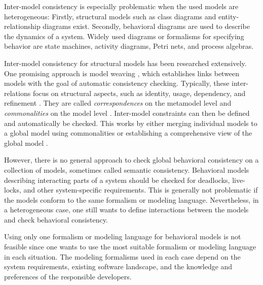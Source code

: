 \documentclass[conference]{IEEEtran}
\begin{document}
Inter-model consistency is especially problematic when the used models are heterogeneous:
Firstly, structural models such as class diagrams and entity-relationship diagrams exist.
Secondly, behavioral diagrams are used to describe the dynamics of a system.
Widely used diagrams or formalisms for specifying behavior are state machines, activity diagrams, Petri nets, and process algebras.

Inter-model consistency for structural models has been researched extensively.
One promising approach is model weaving \cite{bezivinCanonicalSchemeModel2006}, which establishes links between models with the goal of automatic consistency checking.
Typically, these inter-relations focus on structural aspects, such as identity, usage, dependency, and refinement \cite{feldmannManagingIntermodelInconsistencies2019, torresSystematicLiteratureReview2020}.
They are called \textit{correspondences} on the metamodel level and \textit{commonalities} on the model level \cite{stunkelMultipleModelSynchronization2020, klareCommonalitiesPreservingConsistency2019}.
Inter-model constraints can then be defined and automatically be checked.
This works by either merging individual models to a global model using commonalities \cite{stunkelMultimodelCorrespondenceIntermodel2018} or establishing a comprehensive view of the global model \cite{stunkelMultipleModelSynchronization2020}.

However, there is no general approach to check global behavioral consistency on a collection of models, sometimes called semantic consistency.
Behavioral models describing interacting parts of a system should be checked for deadlocks, live-locks, and other system-specific requirements.
This is generally not problematic if the models conform to the same formalism or modeling language.
Nevertheless, in a heterogeneous case, one still wants to define interactions between the models and check behavioral consistency.

Using only one formalism or modeling language for behavioral models is not feasible since one wants to use the most suitable formalism or modeling language in each situation.
The modeling formalisms used in each case depend on the system requirements, existing software landscape, and the knowledge and preferences of the responsible developers. 
\end{document}
